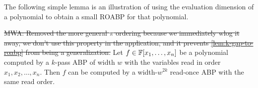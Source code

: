 \documentclass[11pt]{article}
\newcommand{\Mattnote}[1]{\textcolor{OliveGreen}{MWA: #1}}
\providecommand{\DIFdel}[1]{{\protect\color{red}\sout{#1}}}                      %
\providecommand{\DIFdelbegin}{} %
\providecommand{\DIFdelend}{} %
\begin{document}
The following simple lemma is an illustration of using the evaluation dimension of a polynomial to obtain a small ROABP for that polynomial.   

\begin{lemma}\label{lem:k-pass-to-roabp}
\DIFdelbegin \DIFdel{\Mattnote{Removed the more general $\pi$ ordering because we immediately wlog it away, we don't use this property in the application, and it prevents \autoref{lem:k-gap-to-roabp} from being a generalization.}
}\DIFdelend %
Let $f \in \F[x_1, \ldots, x_n]$ be a polynomial computed by a $k$-pass ABP of width $w$ with the variables read in order $x_1,x_2,\ldots,x_n$.
Then $f$ can be computed by a width-$w^{2k}$ read-once ABP with the same read order.
\end{lemma}
\end{document}
